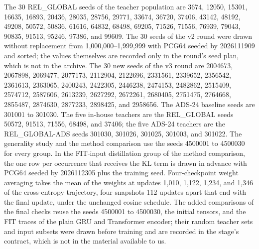 The 30 REL\_GLOBAL seeds of the teacher population are 3674, 12050, 15301, 16635, 16893, 20436, 28035,
28756, 29771, 33674, 36720, 37406, 43142, 48192, 49208, 50572, 50836,
61616, 64832, 68498, 69205, 71526, 71556, 76939, 79043, 90835, 91513,
95246, 97386, and 99609. The 30 seeds of the v2 round were drawn without
replacement from 1,000,000--1,999,999 with PCG64 seeded by 2026111909
and sorted; the values themselves are recorded only in the round's seed
plan, which is not in the archive. The 30 new seeds of the v3 round are
2004673, 2067898, 2069477, 2077173, 2112904, 2122696, 2331561, 2339652,
2356542, 2361613, 2363065, 2400243, 2422305, 2446238, 2474153, 2482862,
2515409, 2574712, 2587606, 2613239, 2627292, 2672261, 2680405, 2751475,
2764668, 2855487, 2874630, 2877233, 2898425, and 2958656. The ADS-24 baseline seeds are 301001 to 301030. The five in-house teachers are the REL\_GLOBAL seeds 50572,
91513, 71556, 68498, and 37406; the five ADS-24 teachers are the
REL\_GLOBAL-ADS seeds 301030, 301026, 301025, 301003, and 301022. The
generality study and the method comparison use the seeds 4500001 to
4500030 for every group. In the FIT-input distillation group of the
method comparison, the one row per occurrence that receives the KL term
is drawn in advance with PCG64 seeded by 2026112305 plus the training
seed. Four-checkpoint weight averaging takes the mean of the weights at
updates 1,010, 1,122, 1,234, and 1,346 of the cross-entropy trajectory,
four snapshots 112 updates apart that end with the final update, under
the unchanged cosine schedule. The added comparisons of the final
checks reuse the seeds 4500001 to 4500030, the initial tensors, and the
FIT traces of the plain GRU and Transformer encoder; their random
teacher sets and input subsets were drawn before training and are
recorded in the stage's contract, which is not in the material
available to us.

